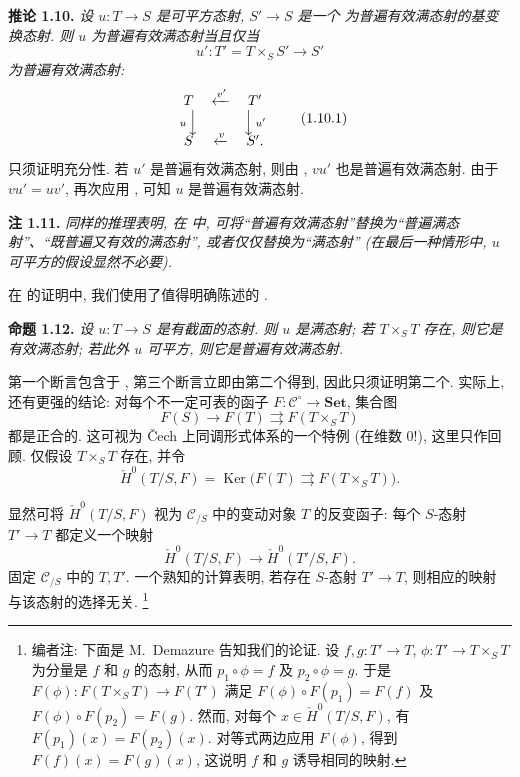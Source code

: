 \medskip
\noindent{}\textbf{推论 1.10.}
\textit{设 \(u:T\to S\) 是可平方态射, \(S'\to S\) 是一个
为普遍有效满态射的基变换态射. 则 \(u\) 为普遍有效满态射当且仅当}
\[
  u':T'=T\times_SS'\longrightarrow S'
\]
\textit{为普遍有效满态射:}
\[
\begin{array}{ccc}
  T & \xleftarrow{v'} & T' \\
  \scriptstyle u\,\Big\downarrow & & \Big\downarrow\,\scriptstyle u' \\[-0.25em]
  S & \xleftarrow{v} & S'.
\end{array}
\tag{1.10.1}\label{sga3:iv:corollary:1:10:eq:1:10:1:01}
\]
只须证明充分性. 若 \(u'\) 是普遍有效满态射, 则由
, \(vu'\) 也是普遍有效满态射.
由于 \(vu'=uv'\), 再次应用 ,
可知 \(u\) 是普遍有效满态射.

\medskip
\noindent{}\textbf{注 1.11.}
\textit{同样的推理表明, 在  中,
可将``普遍有效满态射''替换为``普遍满态射''、``既普遍又有效的满态射'',
或者仅仅替换为``满态射'' (在最后一种情形中, \(u\) 可平方的假设显然不必要).}

在  的证明中,
我们使用了值得明确陈述的 .

\medskip
\noindent{}\textbf{命题 1.12.}
\textit{设 \(u:T\to S\) 是有截面的态射. 则 \(u\) 是满态射;
若 \(T\times_ST\) 存在, 则它是有效满态射;
若此外 \(u\) 可平方, 则它是普遍有效满态射.}

第一个断言包含于 ,
第三个断言立即由第二个得到, 因此只须证明第二个.
实际上, 还有更强的结论: 对每个不一定可表的函子
\(F:\mathscr C^{\circ}\to\mathbf{Set}\), 集合图
\[
  F(S)\longrightarrow F(T)\rightrightarrows F(T\times_ST)
\]
都是正合的. 这可视为 \v{C}ech 上同调形式体系的一个特例
(在维数 \(0\)!), 这里只作回顾. 仅假设 \(T\times_ST\) 存在, 并令
\[
  \check H^{0}(T/S,F)
  =\operatorname{Ker}\bigl(F(T)\rightrightarrows F(T\times_ST)\bigr).
\]

显然可将 \(\check H^{0}(T/S,F)\) 视为 \(\mathscr C_{/S}\) 中的变动对象
\(T\) 的反变函子: 每个 \(S\)-态射
\(T'\to T\) 都定义一个映射
\[
\tag{+}\label{sga3:iv:proposition:1:12:eq:unnamed:01}
  \check H^{0}(T/S,F)\longrightarrow\check H^{0}(T'/S,F).
\]
固定 \(\mathscr C_{/S}\) 中的 \(T,T'\). 一个熟知的计算表明,
若存在 \(S\)-态射 \(T'\to T\), 则相应的映射
与该态射的选择无关.
\footnote{编者注: 下面是 M.~Demazure 告知我们的论证.
设 \(f,g:T'\to T\), \(\phi:T'\to T\times_ST\) 为分量是
\(f\) 和 \(g\) 的态射, 从而 \(p_1\circ\phi=f\) 及
\(p_2\circ\phi=g\). 于是 \(F(\phi):F(T\times_ST)\to F(T')\) 满足
\(F(\phi)\circ F(p_1)=F(f)\) 及 \(F(\phi)\circ F(p_2)=F(g)\).
然而, 对每个 \(x\in\check H^0(T/S,F)\), 有
\(F(p_1)(x)=F(p_2)(x)\). 对等式两边应用 \(F(\phi)\), 得到
\(F(f)(x)=F(g)(x)\), 这说明 \(f\) 和 \(g\) 诱导相同的映射.}

